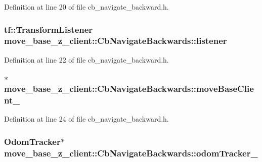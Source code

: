 Definition at line 20 of file cb\+\_\+navigate\+\_\+backward.\+h.

\subsubsection[{\texorpdfstring{listener}{listener}}]{\setlength{\rightskip}{0pt plus 5cm}tf\+::\+Transform\+Listener move\+\_\+base\+\_\+z\+\_\+client\+::\+Cb\+Navigate\+Backwards\+::listener}\hypertarget{classmove__base__z__client_1_1CbNavigateBackwards_a13939ba95a738b73e0e26f215791d675}{}\label{classmove__base__z__client_1_1CbNavigateBackwards_a13939ba95a738b73e0e26f215791d675}


Definition at line 22 of file cb\+\_\+navigate\+\_\+backward.\+h.

\subsubsection[{\texorpdfstring{move\+Base\+Client\+\_\+}{moveBaseClient_}}]{$\ast$ move\+\_\+base\+\_\+z\+\_\+client\+::\+Cb\+Navigate\+Backwards\+::move\+Base\+Client\+\_\+}\hypertarget{classmove__base__z__client_1_1CbNavigateBackwards_a02fb173e95d86f655a1dcf1922db7cec}{}\label{classmove__base__z__client_1_1CbNavigateBackwards_a02fb173e95d86f655a1dcf1922db7cec}


Definition at line 24 of file cb\+\_\+navigate\+\_\+backward.\+h.

\subsubsection[{\texorpdfstring{odom\+Tracker\+\_\+}{odomTracker_}}]{\setlength{\rightskip}{0pt plus 5cm}Odom\+Tracker$\ast$ move\+\_\+base\+\_\+z\+\_\+client\+::\+Cb\+Navigate\+Backwards\+::odom\+Tracker\+\_\+}\hypertarget{classmove__base__z__client_1_1CbNavigateBackwards_aa8c42828e7dd7e6ac0d7751a8f61c251}{}\label{classmove__base__z__client_1_1CbNavigateBackwards_aa8c42828e7dd7e6ac0d7751a8f61c251}


